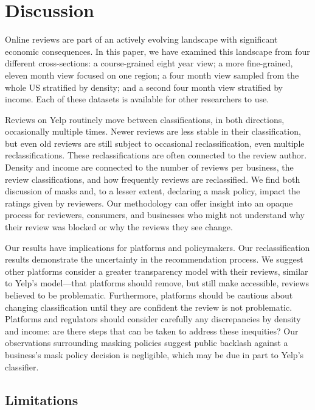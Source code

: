 \section{Discussion} \label{sec:rim:discussion}
Online reviews are part of an actively evolving landscape with significant economic consequences. In this paper, we have examined this landscape from four different cross-sections: a course-grained eight year view;
a more fine-grained, eleven month view focused on one region; a four month view sampled from the whole US stratified by density; and a second four month view stratified by income. Each of these datasets is available for other researchers to use. 


Reviews on Yelp routinely move between classifications, in both directions, occasionally multiple times. Newer reviews are less stable in their classification, but even old reviews are still subject to occasional reclassification, even multiple reclassifications. These reclassifications are often connected to the review author. Density and income are connected to the number of reviews per business, the review classifications, and how frequently reviews are reclassified. We find both discussion of masks and, to a lesser extent, declaring a mask policy, impact the ratings given by reviewers. Our methodology can offer insight into an opaque process for reviewers, consumers, and businesses who might not understand why their review was blocked or why the reviews they see change.

Our results have implications for platforms and policymakers. Our reclassification results demonstrate the uncertainty in the recommendation process. We suggest other platforms consider a greater transparency model with their reviews, similar to Yelp’s model---that platforms should remove, but still make accessible, reviews believed to be problematic. Furthermore, platforms should be cautious about changing classification until they are confident the review is not problematic. Platforms and regulators should consider carefully any discrepancies by density and income: are there steps that can be taken to address these inequities? Our observations surrounding masking policies suggest public backlash against a business's mask policy decision is negligible, which may be due in part to Yelp's classifier.




\subsection{Limitations} \label{subsec:rim:limitations}

